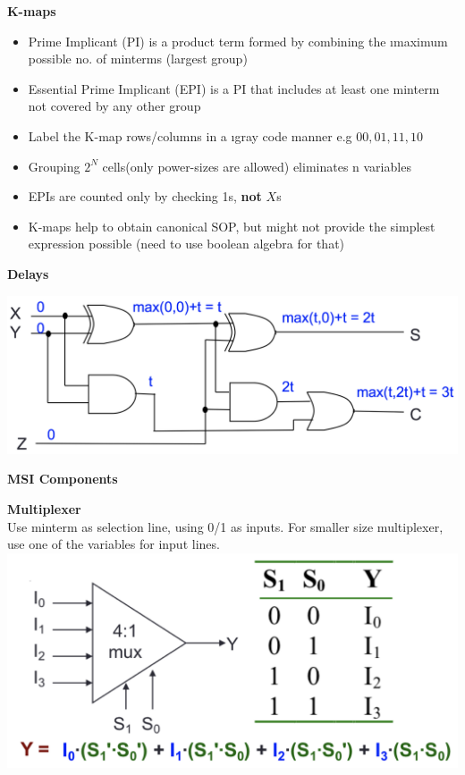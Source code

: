 \documentclass[a4paper]{article} \usepackage[backend=biber, style=numeric, sorting=none]{biblatex}
\begin{document}
\begin{multicols*}{4}
\textbf{K-maps}
\begin{itemize}[leftmargin=*]
\itemsep -0.5em
\item Prime Implicant (PI) is a product term formed by combining the {\i maximum} possible no. of minterms (largest group)
\item Essential Prime Implicant (EPI) is a PI that includes at least one minterm not covered by any other group
\item Label the K-map rows/columns in a {\i gray code} manner e.g $00, 01, 11, 10$
\item Grouping $2^N$ cells(only power-sizes are allowed) eliminates n variables
\item EPIs are counted only by checking 1s, {\bf not} $X$s
\item K-maps help to obtain canonical SOP, but might not provide the simplest expression possible (need to use boolean algebra for that)
\end{itemize}

\textbf {Delays} 
\begin{center}
\includegraphics[scale=0.18]{circuit_delay}
\end{center}

\columnbreak
\textbf{MSI Components}

\begin{multicols*}{2}
\textbf{{Multiplexer}}
\\ Use minterm as selection line, using 0/1 as inputs. For smaller size multiplexer, use one of the variables for input lines.
\vfill\null
\columnbreak
{\centering \includegraphics[scale=0.16]{multiplexer}}
\end{multicols*}


\end{multicols*}
\end{document}

